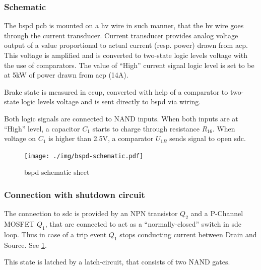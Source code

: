 \subsubsection{Schematic}
The \gls{bspd} \gls{pcb} is mounted on a \gls{hv} wire in such manner, that the \gls{hv} wire goes through the
current transducer. Current transducer provides analog voltage output of a value proportional to
actual current (resp. power) drawn from \gls{acp}. This voltage is amplified and is converted to two-state
logic levels voltage with the use of comparators. The value of “High” current signal logic level
is set to be at 5kW of power drawn from \gls{acp} (14A).

Brake state is measured in \gls{ecup}, converted with help of a comparator to two-state logic levels
voltage and is sent directly to \gls{bspd} via wiring.

Both logic signals are connected to NAND inputs. When both inputs are at “High” level, a
capacitor $C_1$ starts to charge through resistance $R_{16}$. When voltage on $C_1$ is higher than 2.5V, a
comparator $U_{1B}$ sends signal to open \gls{sdc}.

\begin{figure}[H]
	\centering
	\texttt{[image: ./img/bspd-schematic.pdf]}
	\caption{\gls{bspd} schematic sheet}
	\label{fig:BSPD-schematic}
\end{figure}

\subsubsection{Connection with shutdown circuit}
The connection to \gls{sdc} is provided by an NPN transistor $Q_2$ and a P-Channel MOSFET $Q_1$, that
are connected to act as a “normally-closed” switch in \gls{sdc} loop. Thus in case of a trip event $Q_1$
stops conducting current between Drain and Source. See \ref{fig:BSPD-schematic}.

This state is latched by a latch-circuit, that consists of two NAND gates.


